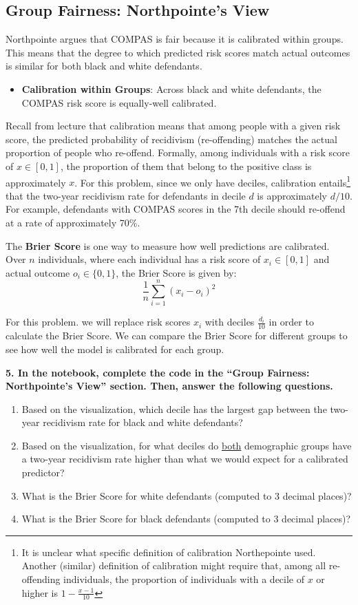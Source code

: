 \documentclass{article}
\begin{document}
\subsection*{Group Fairness: Northpointe's View}

Northpointe argues that COMPAS is fair because it is calibrated within groups. This means that the degree to which predicted risk scores match actual outcomes is similar for both black and white defendants.

\begin{itemize}
    \item \textbf{Calibration within Groups}: Across black and white defendants, the COMPAS risk score is equally-well calibrated. 
\end{itemize}

Recall from lecture that calibration means that among people with a given risk score, the predicted probability of recidivism (re-offending) matches the actual proportion of people who re-offend. Formally, among individuals with a risk score of $x \in [0,1]$, the proportion of them that belong to the positive class is approximately $x$. For this problem, since we only have deciles, calibration entails\footnote{It is unclear what specific definition of calibration Northepointe used. Another (similar) definition of calibration might require that, among all re-offending individuals, the proportion of individuals with a decile of $x$ or higher is  $1-\frac{x-1}{10}$} that the two-year recidivism rate for defendants in decile $d$ is approximately $d/10$. For example, defendants with COMPAS scores in the 7th decile should re-offend at a rate of approximately 70\%.

The \textbf{Brier Score} is one way to measure how well predictions are calibrated. Over $n$ individuals, where each individual has a risk score of $x_i \in [0,1]$ and actual outcome $o_i \in \{0,1\}$, the Brier Score is given by:
$$\frac{1}{n} \sum_{i=1}^{n} (x_i - o_i)^2$$

For this problem. we will replace risk scores $x_i$ with deciles $\frac{d_i}{10}$ in order to calculate the Brier Score. We can compare the Brier Score for different groups to see how well the model is calibrated for each group.

\textbf{5. In the notebook, complete the code in the ``Group Fairness: Northpointe's View'' section. Then, answer the following questions.}
\begin{enumerate}[label=\Alph*.]
\item Based on the visualization, which decile has the largest gap between the two-year recidivism rate for black and white defendants?  
\item Based on the visualization, for what deciles do \underline{both} demographic groups have a two-year recidivism rate higher than what we would expect for a calibrated predictor?
\item What is the Brier Score for white defendants (computed to 3 decimal places)?
\item What is the Brier Score for black defendants (computed to 3 decimal places)?
\end{enumerate}
\end{document}
